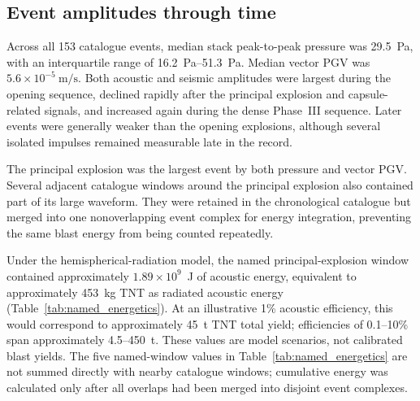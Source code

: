 \documentclass[]{seismica}
\begin{document}
\subsection{Event amplitudes through time}
\label{sec:results_temporal}

Across all 153 catalogue events, median stack peak-to-peak pressure was
\SI{29.5}{\pascal}, with an interquartile range of
\SIrange{16.2}{51.3}{\pascal}. Median vector PGV was
$5.6\times10^{-5}\ \si{\metre\per\second}$. Both acoustic and seismic
amplitudes were largest during the opening sequence, declined rapidly after the
principal explosion and capsule-related signals, and increased again during the
dense Phase~III sequence. Later events were generally weaker than the
opening explosions, although several isolated impulses remained measurable late
in the record.

The principal explosion was the largest event by both pressure and vector PGV.
Several adjacent catalogue windows around the principal explosion also
contained part of its large waveform. They were retained in the chronological
catalogue but merged into one nonoverlapping event complex for energy
integration, preventing the same blast energy from being counted repeatedly.

Under the hemispherical-radiation model, the named principal-explosion window
contained approximately $1.89\times10^9$~J of acoustic energy, equivalent to
approximately 453~kg TNT as radiated acoustic energy
(Table~\ref{tab:named_energetics}). At an illustrative 1\% acoustic efficiency,
this would correspond to approximately 45~t TNT total yield; efficiencies of
0.1--10\% span approximately 4.5--450~t. These values are model scenarios, not
calibrated blast yields. The five named-window values in
Table~\ref{tab:named_energetics} are not summed directly with nearby catalogue
windows; cumulative energy was calculated only after all overlaps had been
merged into disjoint event complexes.
\end{document}
